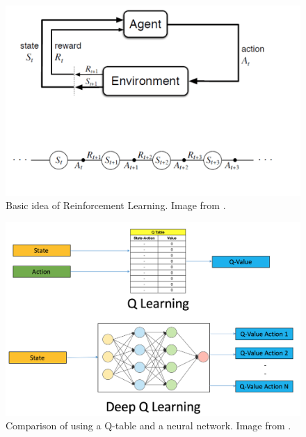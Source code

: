 \documentclass[runningheads,envcountsect]{llncs}
\begin{document}
\begin{figure}[t]
  \centering
  \includegraphics[scale=0.7]{img/rl_base.png}
  \caption{Basic idea of Reinforcement Learning. Image from \cite{dql_guide2}.}
  \label{fig:rl}
\end{figure}

\begin{figure}[t]
  \centering
  \includegraphics[scale=0.3]{img/dql.png}
  \caption{Comparison of using a Q-table and a neural network. Image from \cite{dql_guide}.}
  \label{fig:dql}
\end{figure}
\end{document}
